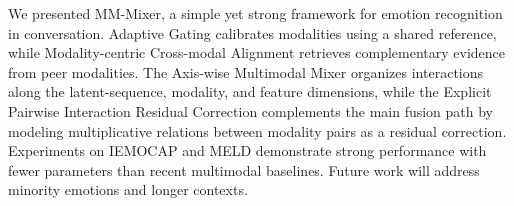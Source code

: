 \documentclass[letterpaper]{article} %
\begin{document}
We presented MM-Mixer, a simple yet strong framework for emotion
recognition in conversation. Adaptive Gating calibrates modalities
using a shared reference, while Modality-centric Cross-modal Alignment
retrieves complementary evidence from peer modalities. The Axis-wise
Multimodal Mixer organizes interactions along the latent-sequence,
modality, and feature dimensions, while the Explicit Pairwise
Interaction Residual Correction complements the main fusion path by
modeling multiplicative relations between modality pairs as a residual
correction. Experiments on IEMOCAP and MELD demonstrate strong
performance with fewer parameters than recent multimodal baselines.
Future work will address minority emotions and longer contexts.






\end{document}
